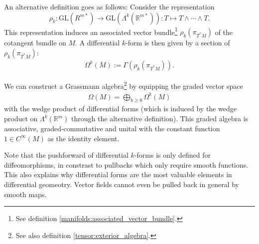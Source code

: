    \begin{adefinition}
        An alternative definition goes as follows: Consider the representation \[\rho_k:\text{GL}(R^{m*})\rightarrow\text{GL}(\Lambda^k(\mathbb{R}^{m*})): T\mapsto T\wedge\cdots\wedge T.\] This representation induces an associated vector bundle\footnote{See definition \ref{manifolds:associated_vector_bundle}.} $\rho_k(\pi_{T^*M})$ of the cotangent bundle on $M$. A differential $k$-form is then given by a section of $\rho_k(\pi_{T^*M})$:
        \begin{gather}
            \Omega^k(M) := \Gamma(\rho_k(\pi_{T^*M})).
        \end{gather}
    \end{adefinition}

    \begin{construct}
        We can construct a Grassmann algebra\footnote{See also definition \ref{tensor:exterior_algebra}.} by equipping the graded vector space
        \begin{gather}
            \Omega(M) = \bigoplus_{k\geq0}\Omega^k(M)
        \end{gather}
        with the wedge product of differential forms (which is induced by the wedge product on $\Lambda^k(\mathbb{R}^m)$ through the alternative definition). This graded algebra is associative, graded-commutative and unital with the constant function $1\in C^{\infty}(M)$ as the identity element.
    \end{construct}

    \begin{remark*}
        Note that the pushforward of differential $k$-forms is only defined for diffeomorphisms, in constrast to pullbacks which only require smooth functions. This also explains why differential forms are the most valuable elements in differential geomeotry. Vector fields cannot even be pulled back in general by smooth maps.
    \end{remark*}

